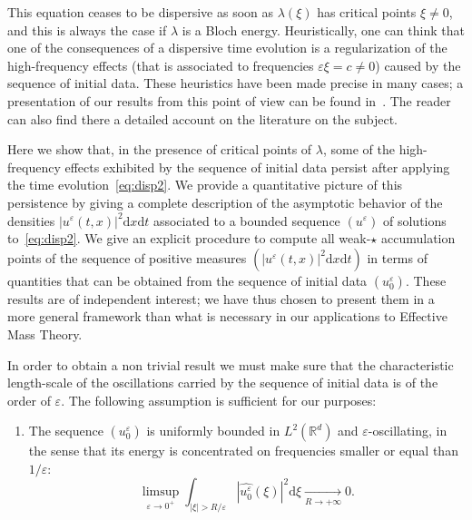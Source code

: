 \documentclass[10pt]{amsart}
\theoremstyle{definition}
\newcommand*\R{{\mathbb R}}
\newcommand*\eps{\varepsilon}
\numberwithin{equation}{section}
\def\Tend#1#2{\mathop{\longrightarrow}\limits_{#1\rightarrow#2}}
\newcommand*{\Henumi}{\renewcommand*{\theenumi}{{H\arabic{enumi}}}}
\newcommand*{\dd}{\mathrm{d}}
\newcommand*{\dt}{\dd t}
\newcommand*{\dx}{\dd x}
\newcommand*{\dxi}{\dd \xi}
\begin{document}


This equation ceases to be dispersive as soon as $\lambda(\xi)$ has critical points $\xi \neq 0$, and this is always the case if $\lambda$ is a Bloch energy. Heuristically, one can think that one of the consequences of a dispersive time evolution is a regularization of the high-frequency effects (that is associated to frequencies $\eps\xi=c\neq 0$) caused by the sequence of initial data. These heuristics have been made precise in many cases; a presentation of our results from this point of view can be found in~\cite{CFMProc}. The reader can also find there a detailed account on the literature on the subject.


Here we show that, in the presence of critical points of $\lambda$, some of the high-frequency effects exhibited by the sequence of initial data persist after applying the time evolution~\eqref{eq:disp2}. We provide a quantitative picture of this persistence by giving a complete description of the asymptotic behavior of the densities $|u^\eps(t,x)|^2\dx\dt$ associated to a bounded sequence $(u^\eps)$ of solutions to~\eqref{eq:disp2}. We give an explicit procedure to compute all weak-$\star$ accumulation points of the sequence of positive measures $(|u^\eps(t,x)|^2\dx\dt)$ in terms of quantities that can be obtained from the sequence of initial data $(u_{0}^{\eps})$. These results are of independent interest; we have thus chosen to present them in a more general framework than what is necessary in our applications to Effective Mass Theory.


In order to obtain a non trivial result we must make sure that the characteristic length-scale of the oscillations carried by the sequence of initial data is of the order of $\eps$. The following assumption is sufficient for our purposes:
\begin{enumerate}\Henumi
\setcounter{enumi}{-1}\item\label{list2H0} The sequence $(u^\eps_0)$ is uniformly bounded in $L^2(\R^d)$ and $\eps$-oscillating, in the sense that its energy is concentrated on frequencies smaller or equal than $1/\eps$:
\begin{equation}\label{def:eps-osc}
\limsup_{\eps\rightarrow 0^+}\int_{|\xi|>R/\eps} \left| \widehat{u^\eps_0} (\xi)\right|^2 \dxi \Tend{R}{+\infty} 0.
\end{equation}
\end{enumerate}
\end{document}
